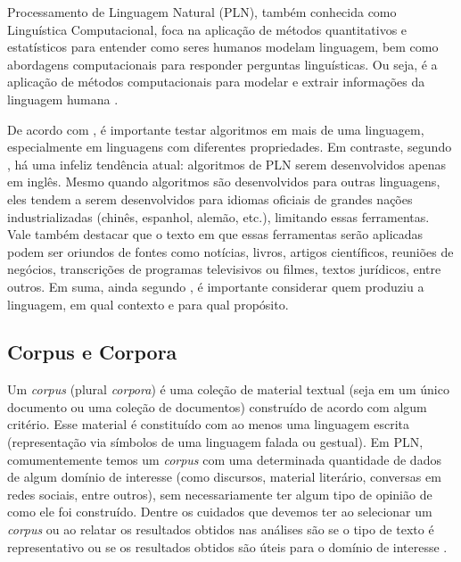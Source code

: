 \documentclass[twoside]{automatextcc}
\begin{document}
Processamento de Linguagem Natural (PLN), também conhecida como Linguística Computacional, foca na aplicação de métodos quantitativos e estatísticos para entender como seres humanos modelam linguagem, bem como abordagens computacionais para responder perguntas linguísticas. Ou seja, é a aplicação de métodos computacionais para modelar e extrair informações da linguagem humana \citep{kamath2019}. 

De acordo com \citet{jurafsky2021}, é importante testar algoritmos em mais de uma linguagem, especialmente em linguagens com diferentes propriedades. Em contraste, segundo \citet{bender2019}, há uma infeliz tendência atual: algoritmos de PLN serem desenvolvidos apenas em inglês. Mesmo quando algoritmos são desenvolvidos para outras linguagens, eles tendem a serem desenvolvidos para idiomas oficiais de grandes nações industrializadas (chinês, espanhol, alemão, etc.), limitando essas ferramentas. Vale também destacar que o texto em que essas ferramentas serão aplicadas podem ser oriundos de fontes como notícias, livros, artigos científicos, reuniões de negócios, transcrições de programas televisivos ou filmes, textos jurídicos, entre outros. Em suma, ainda segundo \citet{jurafsky2021}, é importante considerar quem produziu a linguagem, em qual contexto e para qual propósito.



\subsection{Corpus e Corpora}
Um \textit{corpus} (plural \textit{corpora}) é uma coleção de material textual (seja em um único documento ou uma coleção de documentos) construído de acordo com algum critério. Esse material é constituído com ao menos uma linguagem escrita (representação via símbolos de uma linguagem falada ou gestual). Em PLN, comumentemente temos um \textit{corpus} com uma determinada quantidade de dados de algum domínio de interesse (como discursos, material literário, conversas em redes sociais, entre outros), sem necessariamente ter algum tipo de opinião de como ele foi construído. Dentre os cuidados que devemos ter ao selecionar um \textit{corpus} ou ao relatar os resultados obtidos nas análises são se o tipo de texto é representativo ou se os resultados obtidos são úteis para o domínio de interesse \citep{manning1999, kamath2019}.



\end{document}
